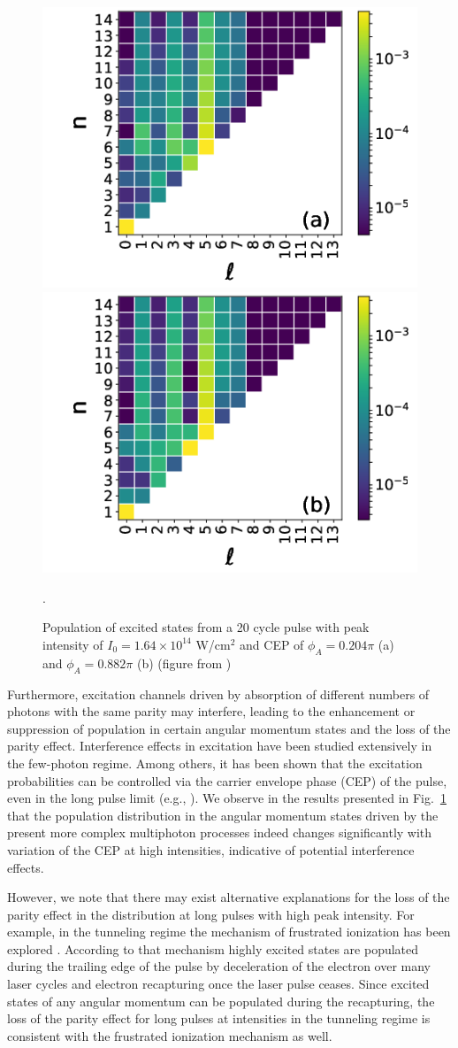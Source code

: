 \begin{figure}[!ht]
\centering
\includegraphics[width=0.32\columnwidth]{figs/Rydberg/heat_cep_test_0p102_20_cyc_16p4e13.png}
\includegraphics[width=0.32\columnwidth]{figs/Rydberg/heat_cep_test_0p441_20_cyc_16p4e13.png}
\caption{\label{fig:CEP_Effects_20_cyc}
Population of excited states from a 20 cycle pulse with peak intensity of $I_0 = 1.64 \times 10^{14}$ W/cm$^2$ and CEP of $\phi_A=0.204\pi$ (a) and $\phi_A=0.882\pi$ (b) (figure from \cite{venzke2018_ryd})}.
\end{figure}

Furthermore, excitation channels driven by absorption of different numbers of photons with the same parity may interfere, leading to the enhancement or suppression of population in certain angular momentum states and the loss of the parity effect. Interference effects in excitation have been studied extensively in the few-photon regime. Among others, it has been shown that the excitation probabilities can be controlled via the carrier envelope phase (CEP) of the pulse, even in the long pulse limit (e.g., \cite{zhao2013,zhao2014}). We observe in the results presented in Fig.\ \ref{fig:CEP_Effects_20_cyc} that the population distribution in the angular momentum states driven by the present more complex multiphoton processes indeed changes significantly with variation of the CEP at high intensities, indicative of potential interference effects.

However, we note that there may exist alternative explanations for the loss of the parity effect in the distribution at long pulses with high peak intensity. For example, in the tunneling regime the mechanism of frustrated ionization has been explored \cite{nubbemeyer2008}. According to that mechanism highly excited states are populated during the trailing edge of the pulse by deceleration of the electron over many laser cycles and electron recapturing once the laser pulse ceases. Since excited states of any angular momentum can be populated during the recapturing, the loss of the parity effect for long pulses at intensities in the tunneling regime is consistent with the frustrated ionization mechanism as well.

